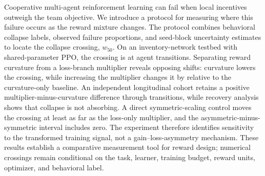 Cooperative multi-agent reinforcement learning can fail when local incentives outweigh the team objective. We introduce a protocol for measuring where this failure occurs as the reward mixture changes. The protocol combines behavioral collapse labels, observed failure proportions, and seed-block uncertainty estimates to locate the \AbstractCrossingProbability{} collapse crossing, $w_{50}$. On an inventory-network testbed with shared-parameter PPO, the crossing is \AbstractCrossing{} at \PrimaryBudget{} agent transitions. Separating reward curvature from a loss-branch multiplier reveals opposing shifts: curvature lowers the crossing, while increasing the multiplier changes it by \LossMultiplierShift{} relative to the curvature-only baseline. An independent longitudinal cohort retains a positive multiplier-minus-curvature difference through \MaxConfirmationBudget{} transitions, while recovery analysis shows that collapse is not absorbing. A direct symmetric-scaling control moves the crossing at least as far as the loss-only multiplier, and the asymmetric-minus-symmetric interval includes zero. The experiment therefore identifies sensitivity to the transformed training signal, not a gain--loss-asymmetry mechanism. These results establish a comparative measurement tool for reward design; numerical crossings remain conditional on the task, learner, training budget, reward units, optimizer, and behavioral label.

